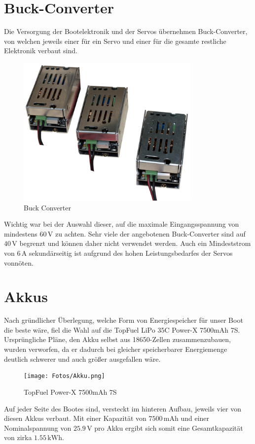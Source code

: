 \section{Buck-Converter}
Die Versorgung der Bootelektronik und der Servos übernehmen Buck-Converter, von welchen jeweils einer für ein Servo und einer für die gesamte restliche Elektronik verbaut sind.
\begin{figure}[h]
    \centering
    \includegraphics[width=0.8\textwidth]{Fotos/Buck_Converter.png}
    \caption{Buck Converter}
\end{figure}

Wichtig war bei der Auswahl dieser, auf die maximale Eingangsspannung von mindestens $60\,\mathrm{V}$ zu achten. Sehr viele der angebotenen Buck-Converter sind auf $40\,\mathrm{V}$ begrenzt und können daher nicht verwendet werden.
Auch ein Mindeststrom von $6\,\mathrm{A}$ sekundärseitig ist aufgrund des hohen Leistungsbedarfes der Servos vonnöten. 
\newpage

\section{Akkus \label{sec:Akkus}}
Nach gründlicher Überlegung, welche Form von Energiespeicher für unser Boot die beste wäre, fiel die Wahl auf die TopFuel LiPo 35C Power-X 7500mAh 7S.
Ursprüngliche Pläne, den Akku selbst aus 18650-Zellen zusammenzubauen, wurden verworfen, da er dadurch bei gleicher speicherbarer Energiemenge deutlich schwerer und auch größer ausgefallen wäre.
\begin{figure}[h]
    \centering
    \texttt{[image: Fotos/Akku.png]}
    \caption{TopFuel Power-X 7500mAh 7S}
\end{figure}

Auf jeder Seite des Bootes sind, versteckt im hinteren Aufbau, jeweils vier von diesen Akkus verbaut. Mit einer Kapazität von $7500\,\textrm{mAh}$ und einer Nominalspannung von $25.9\,\mathrm{V}$ pro Akku ergibt sich somit eine Gesamtkapazität von zirka $1.55\,\mathrm{kWh}$.

\newpage